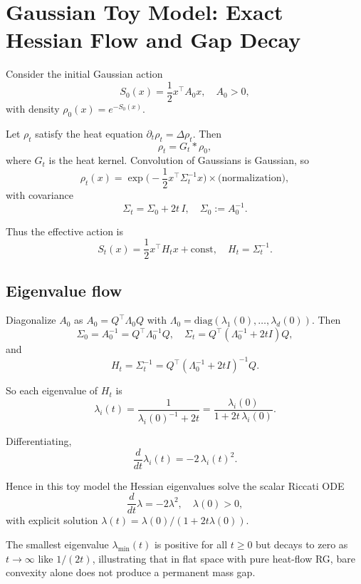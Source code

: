 
\section{Gaussian Toy Model: Exact Hessian Flow and Gap Decay}

Consider the initial Gaussian action
\[
S_0(x) = \frac{1}{2} x^\top A_0 x, \quad A_0 > 0,
\]
with density $\rho_0(x) = e^{-S_0(x)}$.

Let $\rho_t$ satisfy the heat equation $\partial_t \rho_t = \Delta \rho_t$. Then
\[
\rho_t = G_t * \rho_0,
\]
where $G_t$ is the heat kernel. Convolution of Gaussians is Gaussian, so
\[
\rho_t(x) = \exp\!\Big(-\frac{1}{2} x^\top \Sigma_t^{-1} x\Big)\times \text{(normalization)},
\]
with covariance
\[
\Sigma_t = \Sigma_0 + 2t\, I,\quad \Sigma_0 := A_0^{-1}.
\]

Thus the effective action is
\[
S_t(x) = \frac{1}{2} x^\top H_t x + \text{const},
\quad H_t = \Sigma_t^{-1}.
\]

\subsection{Eigenvalue flow}

Diagonalize $A_0$ as $A_0 = Q^\top \Lambda_0 Q$ with
$\Lambda_0 = \mathrm{diag}(\lambda_1(0),\dots,\lambda_d(0))$.
Then
\[
\Sigma_0 = A_0^{-1} = Q^\top \Lambda_0^{-1} Q,
\quad
\Sigma_t = Q^\top(\Lambda_0^{-1} + 2tI) Q,
\]
and
\[
H_t = \Sigma_t^{-1}
= Q^\top (\Lambda_0^{-1} + 2tI)^{-1} Q.
\]

So each eigenvalue of $H_t$ is
\[
\lambda_i(t)
= \frac{1}{\lambda_i(0)^{-1} + 2t}
= \frac{\lambda_i(0)}{1 + 2t\,\lambda_i(0)}.
\]

Differentiating,
\[
\frac{d}{dt}\lambda_i(t)
= -2\,\lambda_i(t)^2.
\]

Hence in this toy model the Hessian eigenvalues solve the scalar Riccati ODE
\[
\frac{d}{dt}\lambda = -2\lambda^2,\quad \lambda(0)>0,
\]
with explicit solution $\lambda(t) = \lambda(0)/(1+2t\lambda(0))$.

The smallest eigenvalue $\lambda_{\min}(t)$ is positive for all $t\ge 0$ but decays to zero
as $t\to \infty$ like $1/(2t)$, illustrating that in flat space with pure heat-flow RG,
bare convexity alone does not produce a permanent mass gap.
